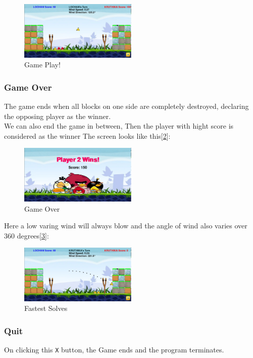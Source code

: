 \documentclass[10pt]{article}
\begin{document}
    \begin{figure}[h!]
        \centering
        \includegraphics[width=0.5\textwidth]{GamePlay}
        \caption{ Game Play!}\label{fig:GamePlay}
    \end{figure}

    \subsubsection{Game Over}
    The game ends when all blocks on one side are completely destroyed, declaring the opposing player as the winner.\\
    We can also end the game in between, Then the player with hight score is considered as the winner
    The screen looks like this[\ref{fig:GameOver}]:
    \begin{figure}[h!]
        \centering
        \includegraphics[width=0.5\textwidth]{GameOver}
        \caption{Game Over}\label{fig:GameOver}
    \end{figure}

    Here a low varing wind will always blow and the angle of wind also varies over 360 degrees[\ref{fig:Wind}]:
    \begin{figure}[h!]
        \centering
        \includegraphics[width=0.5\textwidth]{Wind}
        \caption{Fastest Solves}\label{fig:Wind}
    \end{figure}


    \subsubsection{Quit}
    On clicking this \texttt{X} button, the Game ends and the program terminates.
\end{document}
